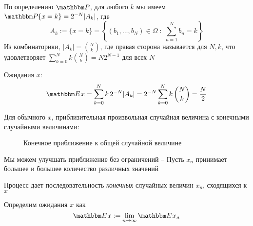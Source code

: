 \begin{frame}
    
    \vspace{2em}
    По определению $\PP$, для любого $k$ мы имеем
    $\PP\{x = k\} = 2^{-N} |A_k|$, где
    \begin{equation*}
         A_k :=
         \{x = k\}
         = \left\{
               (b_1, \ldots, b_N) \in \Omega
                \; : \;
                \sum_{n=1}^N b_n = k
           \right\}
    \end{equation*}
    Из комбинаторики, $|A_k| =
    \binom{N}{k}$, где правая сторона называется  для $N,k$, что удовлетворяет
    $\sum_{k=0}^N k \binom{N}{k} = N 2^{N-1}$ для всех $N$
    
    Ожидания $x$: 
    \begin{equation*}
        \EE x 
        = \sum_{k=0}^N k \, 2^{-N} |A_k|
        = 2^{-N} \sum_{k=0}^N k \, \binom{N}{k} 
        = \frac{N}{2}
    \end{equation*}
\end{frame}


\begin{frame}

    \vspace{2em}
   Для обычного $x$, приблизительная произвольная случайная величина с конечными случайными величинами:
    
    \begin{figure}
   \begin{center}
       \scalebox{0.8}{}
    \caption{\label{f:finite_rv_approx} Конечное приближение к общей случайной величине}
   \end{center}
    \end{figure}
    
\end{frame}


\begin{frame}
    
    \vspace{2em}
    Мы можем улучшать приближение без ограничений -- Пусть $x_n$ принимает большее и 
    большее количество различных значений
    
    Процесс дает последовательность \emph{конечных} случайных величин $x_n$,
    сходящихся к $x$
    
    Определим ожидания $x$ как
    \begin{equation*}
        \label{eq:extar}
        \EE x := \lim_{n \to \infty} \EE x_n
    \end{equation*}

\end{frame}

